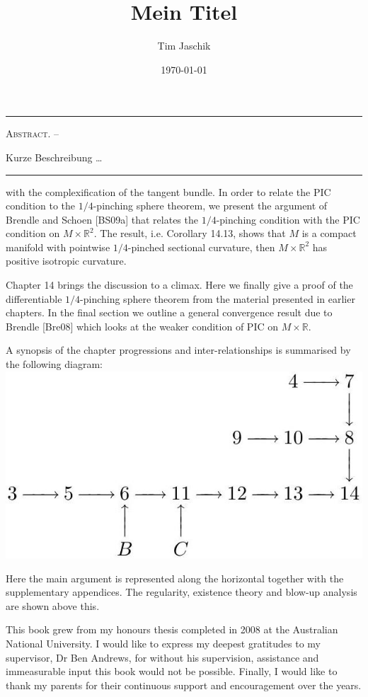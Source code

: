 \documentclass[10pt, letterpaper]{article}
\title{Mein Titel}
\author{Tim Jaschik}
\date{\today}
\renewenvironment{abstract}
  {
    \begin{adjustwidth}{1.5cm}{1.5cm}
    \small
    \textsc{Abstract. –}%
  }
  {
    \end{adjustwidth}
  }
\begin{document}
\maketitle
\rule{\textwidth}{0.5pt}
\begin{abstract}
Kurze Beschreibung …
\end{abstract}
\rule{\textwidth}{0.5pt}
\vspace{0.5cm}

\tableofcontents

\pagebreak


with the complexification of the tangent bundle. In order to relate the PIC condition to the $1 / 4$-pinching sphere theorem, we present the argument of Brendle and Schoen [BS09a] that relates the $1 / 4$-pinching condition with the PIC condition on $M \times \mathbb{R}^{2}$. The result, i.e. Corollary 14.13, shows that $M$ is a compact manifold with pointwise $1 / 4$-pinched sectional curvature, then $M \times \mathbb{R}^{2}$ has positive isotropic curvature.

Chapter 14 brings the discussion to a climax. Here we finally give a proof of the differentiable $1 / 4$-pinching sphere theorem from the material presented in earlier chapters. In the final section we outline a general convergence result due to Brendle [Bre08] which looks at the weaker condition of PIC on $M \times \mathbb{R}$.

A synopsis of the chapter progressions and inter-relationships is summarised by the following diagram:\\
\includegraphics[scale=0.3, center]{2025_05_21_2f79b74cab2419f5632dg-011}

Here the main argument is represented along the horizontal together with the supplementary appendices. The regularity, existence theory and blow-up analysis are shown above this.

This book grew from my honours thesis completed in 2008 at the Australian National University. I would like to express my deepest gratitudes to my supervisor, Dr Ben Andrews, for without his supervision, assistance and immeasurable input this book would not be possible. Finally, I would like to thank my parents for their continuous support and encouragement over the years.
\end{document}
